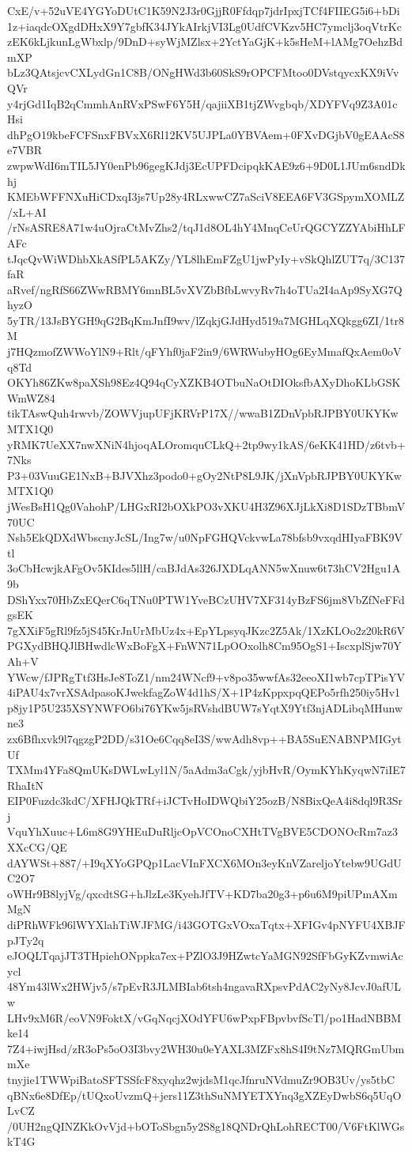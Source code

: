 CxE/v+52uVE4YGYoDUtC1K59N2J3r0GjjR0Ffdqp7jdrIpxjTCf4FIIEG5i6+bDi
1z+iaqdcOXgdDHxX9Y7gbfK34JYkAIrkjVI3Lg0UdfCVKzv5HC7ymclj3oqVtrKc
zEK6kLjkunLgWbxlp/9DnD+syWjMZlsx+2YctYaGjK+k5sHeM+lAMg7OehzBdmXP
bLz3QAtsjcvCXLydGn1C8B/ONgHWd3b60SkS9rOPCFMtoo0DVstqycxKX9iVvQVr
y4rjGd1IqB2qCmmhAnRVxPSwF6Y5H/qajiiXB1tjZWvgbqb/XDYFVq9Z3A01cHsi
dhPgO19kbeFCFSnxFBVxX6Rl12KV5UJPLa0YBVAem+0FXvDGjbV0gEAAcS8e7VBR
zwpwWdI6mTIL5JY0enPb96gegKJdj3EcUPFDcipqkKAE9z6+9D0L1JUm6sndDkhj
KMEbWFFNXuHiCDxqI3js7Up28y4RLxwwCZ7aSciV8EEA6FV3GSpymXOMLZ/xL+AI
/rNsASRE8A71w4uOjraCtMvZhs2/tqJ1d8OL4hY4MnqCeUrQGCYZZYAbiHhLFAFc
tJqcQvWiWDhbXkASfPL5AKZy/YL8lhEmFZgU1jwPyIy+vSkQhlZUT7q/3C137faR
aRvef/ngRfS66ZWwRBMY6mnBL5vXVZbBfbLwvyRv7h4oTUa2I4aAp9SyXG7QhyzO
5yTR/13JsBYGH9qG2BqKmJnfI9wv/lZqkjGJdHyd519a7MGHLqXQkgg6ZI/1tr8M
j7HQzmofZWWoYlN9+Rlt/qFYhf0jaF2in9/6WRWubyHOg6EyMmafQxAem0oVq8Td
OKYh86ZKw8paXSh98Ez4Q94qCyXZKB4OTbuNaOtDIOksfbAXyDhoKLbGSKWmWZ84
tikTAswQuh4rwvb/ZOWVjupUFjKRVrP17X//wwaB1ZDnVpbRJPBY0UKYKwMTX1Q0
yRMK7UeXX7nwXNiN4hjoqALOromquCLkQ+2tp9wy1kAS/6eKK41HD/z6tvb+7Nks
P3+03VuuGE1NxB+BJVXhz3podo0+gOy2NtP8L9JK/jXnVpbRJPBY0UKYKwMTX1Q0
jWesBsH1Qg0VahohP/LHGxRI2bOXkPO3vXKU4H3Z96XJjLkXi8D1SDzTBbmV70UC
Nsh5EkQDXdWbscnyJcSL/Ing7w/u0NpFGHQVckvwLa78bfsb9vxqdHIyaFBK9Vtl
3oCbHcwjkAFgOv5KIdes5llH/caBJdAs326JXDLqANN5wXnuw6t73hCV2Hgu1A9b
DShYxx70HbZxEQerC6qTNu0PTW1YveBCzUHV7XF314yBzFS6jm8VbZfNeFFdgsEK
7gXXiF5gRl9fz5jS45KrJnUrMbUz4x+EpYLpsyqJKzc2Z5Ak/1XzKLOo2z20kR6V
PGXydBHQJlBHwdlcWxBoFgX+FnWN71LpOOxolh8Cm95OgS1+IscxplSjw70YAh+V
YWcw/fJPRgTtf3HsJe8ToZ1/nm24WNcf9+v8po35wwfAs32eeoXI1wb7cpTPisYV
4iPAU4x7vrXSAdpasoKJwekfagZoW4d1hS/X+1P4zKppxpqQEPo5rfh250iy5Hv1
p8jy1P5U235XSYNWFO6bi76YKw5jsRVshdBUW7sYqtX9Ytf3njADLibqMHunwne3
zx6Bfhxvk9l7qgzgP2DD/s31Oe6Cqq8eI3S/wwAdh8vp++BA5SuENABNPMIGytUf
TXMm4YFa8QmUKsDWLwLyl1N/5aAdm3aCgk/yjbHvR/OymKYhKyqwN7iIE7RhaItN
EIP0Fuzdc3kdC/XFHJQkTRf+iJCTvHoIDWQbiY25ozB/N8BixQeA4i8dql9R3Srj
VquYhXuuc+L6m8G9YHEuDuRljcOpVCOnoCXHtTVgBVE5CDONOcRm7az3XXcCG/QE
dAYWSt+887/+I9qXYoGPQp1LacVInFXCX6MOn3eyKnVZareljoYtebw9UGdUC2O7
oWHr9B8lyjVg/qxcdtSG+hJlzLe3KyehJfTV+KD7ba20g3+p6u6M9piUPmAXmMgN
diPRhWFk96lWYXlahTiWJFMG/i43GOTGxVOxaTqtx+XFIGv4pNYFU4XBJFpJTy2q
eJOQLTqajJT3THpiehONppka7ex+PZlO3J9HZwtcYaMGN92SfFbGyKZvmwiAcycl
48Ym43lWx2HWjv5/s7pEvR3JLMBIab6tsh4ngavaRXpsvPdAC2yNy8JcvJ0afULw
LHv9xM6R/eoVN9FoktX/vGqNqcjXOdYFU6wPxpFBpvbvfScTl/po1HadNBBMke14
7Z4+iwjHsd/zR3oPs5oO3I3bvy2WH30u0eYAXL3MZFx8hS4I9tNz7MQRGmUbmmXe
tnyjie1TWWpiBatoSFTSSfcF8xyqhz2wjdsM1qcJfnruNVdmuZr9OB3Uv/ys5tbC
qBNx6e8DfEp/tUQxoUvzmQ+jers11Z3thSuNMYETXYnq3gXZEyDwbS6q5UqOLvCZ
/0UH2ngQINZKkOvVjd+bOToSbgn5y2S8g18QNDrQhLohRECT00/V6FtKlWGskT4G
